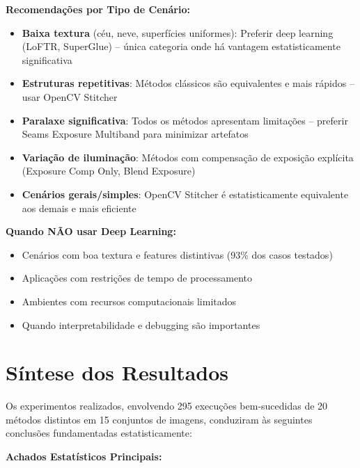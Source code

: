 \textbf{Recomendações por Tipo de Cenário:}
\begin{itemize}
    \item \textbf{Baixa textura} (céu, neve, superfícies uniformes): Preferir deep learning (LoFTR, SuperGlue) -- única categoria onde há vantagem estatisticamente significativa
    \item \textbf{Estruturas repetitivas}: Métodos clássicos são equivalentes e mais rápidos -- usar OpenCV Stitcher
    \item \textbf{Paralaxe significativa}: Todos os métodos apresentam limitações -- preferir Seams Exposure Multiband para minimizar artefatos
    \item \textbf{Variação de iluminação}: Métodos com compensação de exposição explícita (Exposure Comp Only, Blend Exposure)
    \item \textbf{Cenários gerais/simples}: OpenCV Stitcher é estatisticamente equivalente aos demais e mais eficiente
\end{itemize}

\textbf{Quando NÃO usar Deep Learning:}
\begin{itemize}
    \item Cenários com boa textura e features distintivas (93\% dos casos testados)
    \item Aplicações com restrições de tempo de processamento
    \item Ambientes com recursos computacionais limitados
    \item Quando interpretabilidade e debugging são importantes
\end{itemize}

\section{Síntese dos Resultados}

Os experimentos realizados, envolvendo 295 execuções bem-sucedidas de 20 métodos distintos em 15 conjuntos de imagens, conduziram às seguintes conclusões fundamentadas estatisticamente:

\textbf{Achados Estatísticos Principais:}

